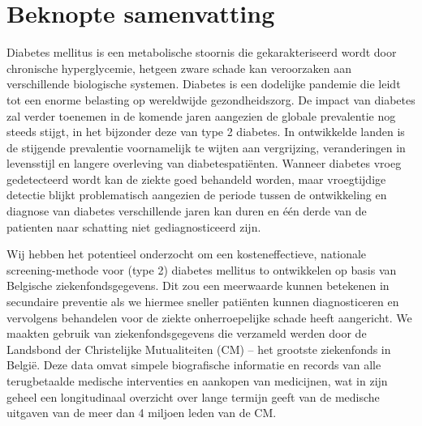 \chapter*{Beknopte samenvatting}

Diabetes mellitus is een metabolische stoornis die gekarakteriseerd wordt door chronische hyperglycemie, hetgeen zware schade kan veroorzaken aan verschillende biologische systemen. Diabetes is een dodelijke pandemie die leidt tot een enorme belasting op wereldwijde gezondheidszorg. De impact van diabetes zal verder toenemen in de komende jaren aangezien de globale prevalentie nog steeds stijgt, in het bijzonder deze van type 2 diabetes. In ontwikkelde landen is de stijgende prevalentie voornamelijk te wijten aan vergrijzing, veranderingen in levensstijl en langere overleving van diabetespati\"enten. Wanneer diabetes vroeg gedetecteerd wordt kan de ziekte goed behandeld worden, maar vroegtijdige detectie blijkt problematisch aangezien de periode tussen de ontwikkeling en diagnose van diabetes verschillende jaren kan duren en \'e\'en derde van de patienten naar schatting niet gediagnosticeerd zijn.


Wij hebben het potentieel onderzocht om een kosteneffectieve, nationale screening-methode voor (type 2) diabetes mellitus to ontwikkelen op basis van Belgische ziekenfondsgegevens. Dit zou een meerwaarde kunnen betekenen in secundaire preventie als we hiermee sneller pati\"enten kunnen diagnosticeren en vervolgens behandelen voor de ziekte onherroepelijke schade heeft aangericht. We maakten gebruik van ziekenfondsgegevens die verzameld werden door de Landsbond der Christelijke Mutualiteiten (CM) -- het grootste ziekenfonds in Belgi\"e. Deze data omvat simpele biografische informatie en records van alle terugbetaalde medische interventies en aankopen van medicijnen, wat in zijn geheel een longitudinaal overzicht over lange termijn geeft van de medische uitgaven van de meer dan 4 miljoen leden van de CM.

